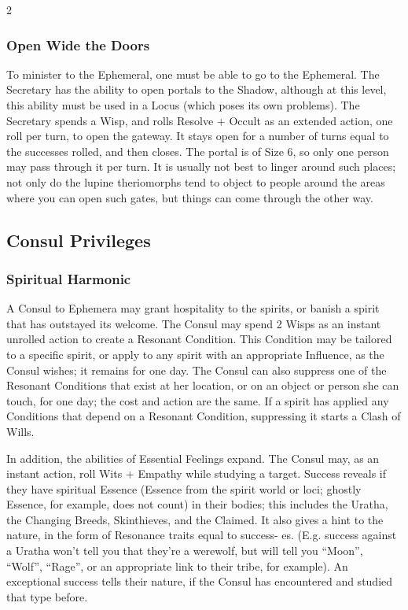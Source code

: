 \begin{multicols}{2}
\subsubsection*{Open Wide the Doors}
To minister to the Ephemeral, one must be able to go to the Ephemeral. The Secretary has the ability to open portals to the Shadow, although at this level, this ability must be used in a Locus (which poses its own problems). The Secretary spends a Wisp, and rolls Resolve + Occult as an extended action, one roll per turn, to open the gateway. It stays open for a number of turns equal to the successes rolled, and then closes. The portal is of Size 6, so only one person may pass through it per turn. It is usually not best to linger around such places; not only do the lupine theriomorphs tend to object to people around the areas where you can open such gates, but things can come through the other way.


\subsection*{Consul Privileges}

\subsubsection*{Spiritual Harmonic}
A Consul to Ephemera may grant hospitality to the spirits, or banish a spirit that has outstayed its welcome. The Consul may spend 2 Wisps as an instant unrolled action to create a Resonant Condition. This Condition may be tailored to a specific spirit, or apply to any spirit with an appropriate Influence, as the Consul wishes; it remains for one day. The Consul can also suppress one of the Resonant Conditions that exist at her location, or on an object or person she can touch, for one day; the cost and action are the same. If a spirit has applied any Conditions that depend on a Resonant Condition, suppressing it starts a Clash of Wills.

In addition, the abilities of Essential Feelings expand. The Consul may, as an instant action, roll Wits + Empathy while studying a target. Success reveals if they have spiritual Essence (Essence from the spirit world or loci; ghostly Essence, for example, does not count) in their bodies; this includes the Uratha, the Changing Breeds, Skinthieves, and the Claimed. It also gives a hint to the nature, in the form of Resonance traits equal to success- es. (E.g. success against a Uratha won’t tell you that they’re a werewolf, but will tell you “Moon”, “Wolf”, “Rage”, or an appropriate link to their tribe, for example). An exceptional success tells their nature, if the Consul has encountered and studied that type before.


\end{multicols}
